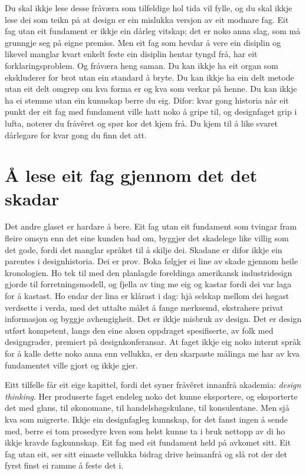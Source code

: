 Du skal ikkje lese desse fråværa som tilfeldige hol tida vil fylle, og du skal ikkje lese dei som teikn på at design er ein mislukka versjon av eit modnare fag. Eit fag utan eit fundament er ikkje ein dårleg vitskap; det er noko anna slag, som må grunngje seg på eigne premiss. Men eit fag som hevdar å vere ein disiplin og likevel manglar kvart enkelt feste ein disiplin hentar tyngd frå, har eit forklaringsproblem. Og fråværa heng saman. Du kan ikkje ha eit organ som ekskluderer for brot utan ein standard å bryte. Du kan ikkje ha ein delt metode utan eit delt omgrep om kva forma er og kva som verkar på henne. Du kan ikkje ha ei stemme utan ein kunnskap berre du eig. Difor: kvar gong historia når eit punkt der eit fag med fundament ville hatt noko å gripe til, og designfaget grip i lufta, noterer du fråvêret og spør kor det kjem frå. Du kjem til å like svaret dårlegare for kvar gong du finn det att.

\section{Å lese eit fag gjennom det det skadar}

Det andre glaset er hardare å bere. Eit fag utan eit fundament som tvingar fram fleire omsyn enn det eine kunden bad om, byggjer det skadelege like villig som det gode, fordi det manglar språket til å skilje dei. Skadane er difor ikkje ein parentes i designhistoria. Dei er prov. Boka følgjer ei line av skade gjennom heile kronologien. Ho tek til med den planlagde foreldinga amerikansk industridesign gjorde til forretningsmodell, og fjella av ting me eig og kastar fordi dei var laga for å kastast. Ho endar der lina er klårast i dag: hjå selskap mellom dei høgast verdsette i verda, med det uttalte målet å fange merksemd, ekstrahere privat informasjon og byggje avhengigheit. Det er ikkje misbruk av design. Det er design utført kompetent, langs den eine aksen oppdraget spesifiserte, av folk med designgrader, premiert på designkonferansar. At faget ikkje eig noko internt språk for å kalle dette noko anna enn vellukka, er den skarpaste målinga me har av kva fundamentet ville gjort og ikkje gjer.

Eitt tilfelle får eit eige kapittel, fordi det syner fråvêret innanfrå akademia: \emph{design thinking}. Her produserte faget endeleg noko det kunne eksportere, og eksporterte det med glans, til økonomane, til handelshøgskulane, til konsulentane. Men sjå kva som migrerte. Ikkje ein designfagleg kunnskap, for det fanst ingen å sende med, berre ei tom prosedyre kven som helst kunne ta i bruk nettopp av di ho ikkje kravde fagkunnskap. Eit fag med eit fundament held på avkomet sitt. Eit fag utan eit, ser sitt einaste vellukka bidrag drive heimanfrå og slå rot der det fyrst finst ei ramme å feste det i.

